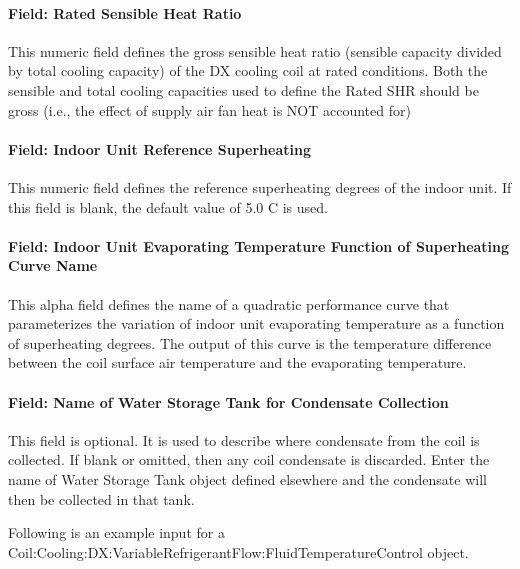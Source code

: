 \paragraph{Field: Rated Sensible Heat Ratio}\label{field-rated-sensible-heat-ratio}

This numeric field defines the gross sensible heat ratio (sensible capacity divided by total cooling capacity) of the DX cooling coil at rated conditions. Both the sensible and total cooling capacities used to define the Rated SHR should be gross (i.e., the effect of supply air fan heat is NOT accounted for)

\paragraph{Field: Indoor Unit Reference Superheating}\label{field-indoor-unit-reference-superheating}

This numeric field defines the reference superheating degrees of the indoor unit. If this field is blank, the default value of 5.0 C is used.

\paragraph{Field: Indoor Unit Evaporating Temperature Function of Superheating Curve Name}\label{field-indoor-unit-evaporating-temperature-function-of-superheating-curve-name}

This alpha field defines the name of a quadratic performance curve that parameterizes the variation of indoor unit evaporating temperature as a function of superheating degrees. The output of this curve is the temperature difference between the coil surface air temperature and the evaporating temperature.

\paragraph{Field: Name of Water Storage Tank for Condensate Collection}\label{field-name-of-water-storage-tank-for-condensate-collection-1}

This field is optional. It is used to describe where condensate from the coil is collected. If blank or omitted, then any coil condensate is discarded. Enter the name of Water Storage Tank object defined elsewhere and the condensate will then be collected in that tank.

Following is an example input for a Coil:Cooling:DX:VariableRefrigerantFlow:FluidTemperatureControl object.

